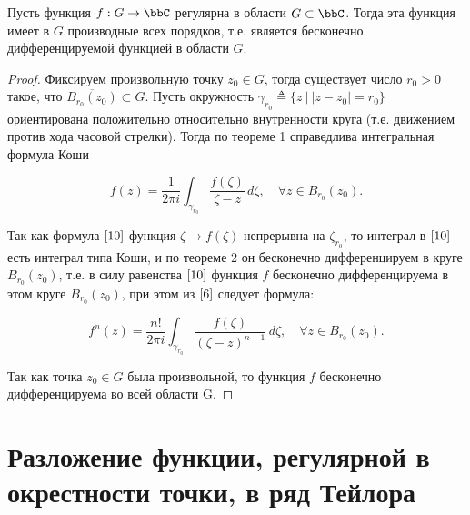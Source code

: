 \begin{thm} \label{T3}

Пусть функция $f : G \to \bbC$ регулярна в области $G \subset \bbC$. Тогда эта функция имеет в $G$ производные всех порядков, т.е. является бесконечно дифференцируемой функцией в области $G$.

\end{thm}
\begin{proof}
Фиксируем произвольную точку $z_0 \in G$, тогда существует число $r_0 > 0$ такое, что $\overline{B_{r_0}(z_0)}\subset G$. Пусть окружность $\gamma_{r_0} \triangleq \{ z \: \bigl| \: |z - z_0| = r_0 \}$ ориентирована положительно относительно внутренности круга (т.е. движением против хода часовой стрелки). Тогда по теореме 1 справедлива интегральная формула Коши

\begin{equation} \label{10}
f(z) = \frac{1}{2\pi i} \int_{\gamma_{r_0}} \frac{f(\zeta)}{\zeta - z} \,d\zeta, \quad \forall z \in B_{r_0}(z_0).
\end{equation}

Так как формула $\eqref{10}$ функция $\zeta \to f(\zeta)$ непрерывна на $\zeta_{r_0}$, то интеграл в $\eqref{10}$ есть интеграл типа Коши, и по теореме 2 он бесконечно дифференцируем в круге $B_{r_0}(z_0)$, т.е. в силу равенства $\eqref{10}$ функция $f$ бесконечно дифференцируема в этом круге $B_{r_0}(z_0)$, при этом из $\eqref{6}$ следует формула:

\begin{equation} \label{11}
f^{n}(z) = \frac{n!}{2\pi i} \int_{\gamma_{r_0}} \frac{f(\zeta)}{(\zeta - z)^{n+1}}\,d\zeta, \quad \forall z \in B_{r_0}(z_0).
\end{equation}

Так как точка $z_0 \in G$ была произвольной, то функция $f$ бесконечно дифференцируема во всей области G.
\end{proof}
\section{Разложение функции, регулярной в окрестности точки, в ряд Тейлора}